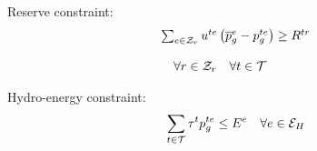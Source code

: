 Reserve constraint:
\begin{equation}
\begin{array}{l}
\sum_{e \in {\cal{Z}}_{r}}{u^{te} \left( \overline{p}_{g}^{e} - p_{g}^{te} \right)} \ge R^{tr}\\
{}\\
 \quad \forall r \in {\cal{Z}}_{r} \quad \forall t  \in {\cal{T}}
\end{array}
\label{reserve}
\end{equation}

Hydro-energy constraint:
\begin{equation}
\sum_{t \in {\cal{T}}}{{\tau}^{t} p_{g}^{te}} \le E^{e} \quad \forall e \in {\cal{E}}_{H}
\label{hidro_energy}
\end{equation}

\newpage
